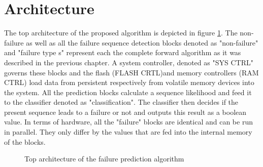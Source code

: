 \documentclass[mscthesis]{usiinfthesis}
\begin{document}
\section{Architecture}
\label{ch:design_arch}

The top architecture of the proposed algorithm is depicted in figure
\ref{fig:arch_top}. The non-failure as well as all the failure sequence
detection blocks denoted as "non-failure" and "failure type s" represent each
the complete forward algorithm as it was described in the previous chapter.
A system controller, denoted as "SYS CTRL" governs these blocks and the flash
(FLASH CRTL)and memory controllers (RAM CTRL) load data from persistent
respectively from volatile memory devices into the system. All the prediction
blocks calculate a sequence likelihood and feed it to the classifier denoted as
"classification". The classifier then decides if the present sequence leads to
a failure or not and outputs this result as a boolean value. In terms of
hardware, all the "failure" blocks are identical and can be run in parallel.
They only differ by the values that are fed into the internal memory of the
blocks.

\begin{figure}
    \centering
    
    \caption{Top architecture of the failure prediction algorithm}
    \label{fig:arch_top}
\end{figure}
\end{document}
